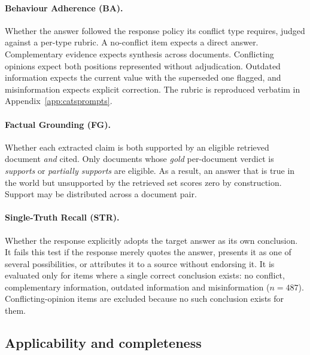 

\paragraph{Behaviour Adherence (BA).} Whether the answer followed the response
policy its conflict type requires, judged against a per-type rubric. A
no-conflict item expects a direct answer. Complementary evidence expects
synthesis across documents. Conflicting opinions expect both positions
represented without adjudication. Outdated information expects the current value
with the superseded one flagged, and misinformation expects explicit correction.
The rubric is reproduced verbatim in Appendix~\ref{app:catsprompts}.

\paragraph{Factual Grounding (FG).} Whether each extracted claim is both
supported by an eligible retrieved document \emph{and} cited. Only documents
whose \emph{gold} per-document verdict is \textit{supports} or \textit{partially
supports} are eligible. As a result, an answer that is true in the world but unsupported by
the retrieved set scores zero by construction. Support may be distributed across
a document pair.

\paragraph{Single-Truth Recall (STR).} Whether the response explicitly adopts the
target answer as its own conclusion. It fails this test if the response merely quotes the
answer, presents it as one of several possibilities, or attributes it to a source
without endorsing it. It is evaluated only for items where a single correct conclusion exists: no
conflict, complementary information, outdated information and misinformation
($n=487$). Conflicting-opinion items are excluded because no such conclusion
exists for them.

\subsection{Applicability and completeness}

